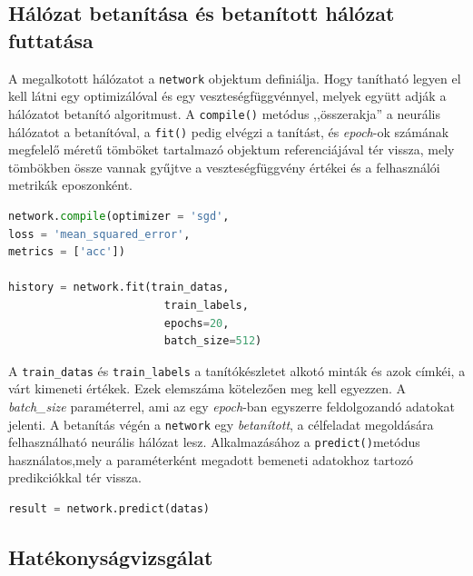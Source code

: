 \subsection{Hálózat betanítása és betanított hálózat futtatása}
\label{subsect:inference}
A megalkotott hálózatot a \verb|network| objektum definiálja. Hogy tanítható legyen el kell látni egy optimizálóval és egy veszteségfüggvénnyel, melyek együtt adják a hálózatot betanító algoritmust. A \verb|compile()| metódus ,,összerakja'' a neurális hálózatot a betanítóval, a \verb|fit()| pedig elvégzi a tanítást, és \emph{epoch}-ok számának megfelelő méretű tömböket tartalmazó objektum referenciájával tér vissza, mely tömbökben össze vannak gyűjtve a veszteségfüggvény értékei és a felhasználói metrikák eposzonként. 
\begin{minipage}{\textwidth}
\begin{lstlisting}[language=Python,caption=Hálózat betanítása]
network.compile(optimizer = 'sgd',
loss = 'mean_squared_error',
metrics = ['acc'])

history = network.fit(train_datas,
						train_labels,
						epochs=20,
						batch_size=512)
\end{lstlisting}\label{lst:fitNetwork}
\end{minipage}

A \verb|train_datas| és \verb|train_labels| a tanítókészletet alkotó minták és azok címkéi, a várt kimeneti értékek. Ezek elemszáma kötelezően meg kell egyezzen. A \emph{batch\_size} paraméterrel, ami az egy \emph{epoch}-ban egyszerre feldolgozandó adatokat jelenti. A betanítás végén a \verb|network| egy \emph{betanított}, a célfeladat megoldására felhasználható neurális hálózat lesz. Alkalmazásához a \verb|predict()|metódus használatos,mely a paraméterként megadott bemeneti adatokhoz tartozó predikciókkal tér vissza.
\begin{minipage}{\textwidth}
\begin{lstlisting}[language=Python, caption=Az eszközre töltött hálózat futtatása az adatokon]
	result = network.predict(datas)
\end{lstlisting}
\end{minipage}

\subsection{Hatékonyságvizsgálat}

